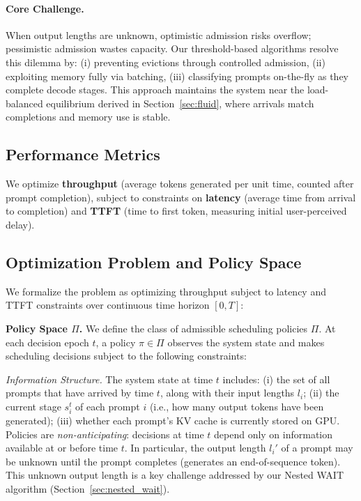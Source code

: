 \paragraph{Core Challenge.}
When output lengths are unknown, optimistic admission risks overflow; pessimistic admission wastes capacity. Our threshold-based algorithms resolve this dilemma by: (i) preventing evictions through controlled admission, (ii) exploiting memory fully via batching, (iii) classifying prompts on-the-fly as they complete decode stages. This approach maintains the system near the load-balanced equilibrium derived in Section~\ref{sec:fluid}, where arrivals match completions and memory use is stable.

\subsection{Performance Metrics}

We optimize \textbf{throughput} (average tokens generated per unit time, counted after prompt completion), subject to constraints on \textbf{latency} (average time from arrival to completion) and \textbf{TTFT} (time to first token, measuring initial user-perceived delay).

\subsection{Optimization Problem and Policy Space}
We formalize the problem as optimizing throughput subject to latency and TTFT constraints over continuous time horizon $[0,T]$:
 

\textbf{Policy Space $\Pi$.} We define the class of admissible scheduling policies $\Pi$. At each decision epoch $t$, a policy $\pi \in \Pi$ observes the system state and makes scheduling decisions subject to the following constraints:

\textit{Information Structure.} The system state at time $t$ includes: (i) the set of all prompts that have arrived by time $t$, along with their input lengths $l_i$; (ii) the current stage $s_i^t$ of each prompt $i$ (i.e., how many output tokens have been generated); (iii) whether each prompt's KV cache is currently stored on GPU. Policies are \textit{non-anticipating}: decisions at time $t$ depend only on information available at or before time $t$. In particular, the output length $l_i'$ of a prompt may be unknown until the prompt completes (generates an end-of-sequence token). This unknown output length is a key challenge addressed by our Nested WAIT algorithm (Section~\ref{sec:nested_wait}).

